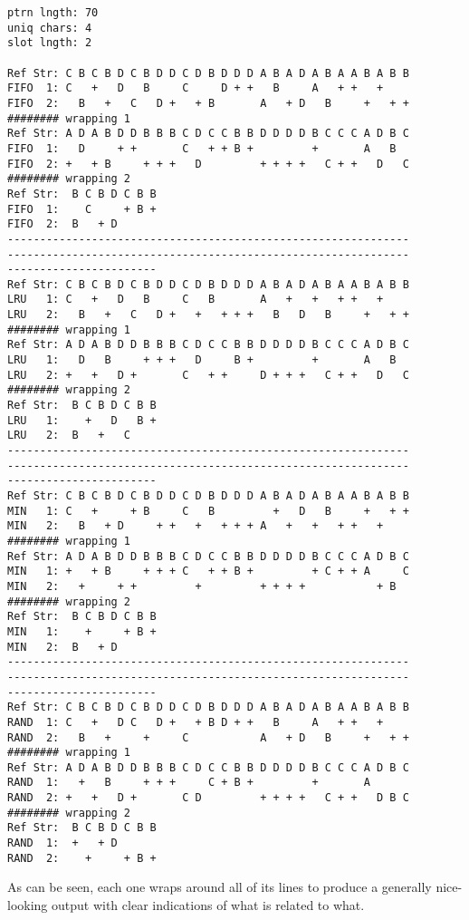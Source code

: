 \documentclass[11pt]{article}
\begin{document}
\begin{lstlisting}
ptrn lngth: 70
uniq chars: 4
slot lngth: 2

Ref Str: C B C B D C B D D C D B D D D A B A D A B A A B A B B
FIFO  1: C   +   D   B     C     D + +   B     A   + +   +
FIFO  2:   B   +   C   D +   + B       A   + D   B     +   + +
######## wrapping 1
Ref Str: A D A B D D B B B C D C C B B D D D D B C C C A D B C
FIFO  1:   D     + +       C   + + B +         +       A   B
FIFO  2: +   + B     + + +   D         + + + +   C + +   D   C
######## wrapping 2
Ref Str:  B C B D C B B
FIFO  1:    C     + B +
FIFO  2:  B   + D
--------------------------------------------------------------
--------------------------------------------------------------
-----------------------
Ref Str: C B C B D C B D D C D B D D D A B A D A B A A B A B B
LRU   1: C   +   D   B     C   B       A   +   +   + +   +
LRU   2:   B   +   C   D +   +   + + +   B   D   B     +   + +
######## wrapping 1
Ref Str: A D A B D D B B B C D C C B B D D D D B C C C A D B C
LRU   1:   D   B     + + +   D     B +         +       A   B
LRU   2: +   +   D +       C   + +     D + + +   C + +   D   C
######## wrapping 2
Ref Str:  B C B D C B B
LRU   1:    +   D   B +
LRU   2:  B   +   C
--------------------------------------------------------------
--------------------------------------------------------------
-----------------------
Ref Str: C B C B D C B D D C D B D D D A B A D A B A A B A B B
MIN   1: C   +     + B     C   B         +   D   B     +   + +
MIN   2:   B   + D     + +   +   + + + A   +   +   + +   +
######## wrapping 1
Ref Str: A D A B D D B B B C D C C B B D D D D B C C C A D B C
MIN   1: +   + B     + + + C   + + B +         + C + + A     C
MIN   2:   +     + +         +         + + + +           + B
######## wrapping 2
Ref Str:  B C B D C B B
MIN   1:    +     + B +
MIN   2:  B   + D
--------------------------------------------------------------
--------------------------------------------------------------
-----------------------
Ref Str: C B C B D C B D D C D B D D D A B A D A B A A B A B B
RAND  1: C   +   D C   D +   + B D + +   B     A   + +   +
RAND  2:   B   +     +     C           A   + D   B     +   + +
######## wrapping 1
Ref Str: A D A B D D B B B C D C C B B D D D D B C C C A D B C
RAND  1:   +   B     + + +     C + B +         +       A
RAND  2: +   +   D +       C D         + + + +   C + +   D B C
######## wrapping 2
Ref Str:  B C B D C B B
RAND  1:  +   + D
RAND  2:    +     + B +

\end{lstlisting}

As can be seen, each one wraps around all of its lines to produce a generally nice-looking output with clear indications of what is related to what.
\end{document}
